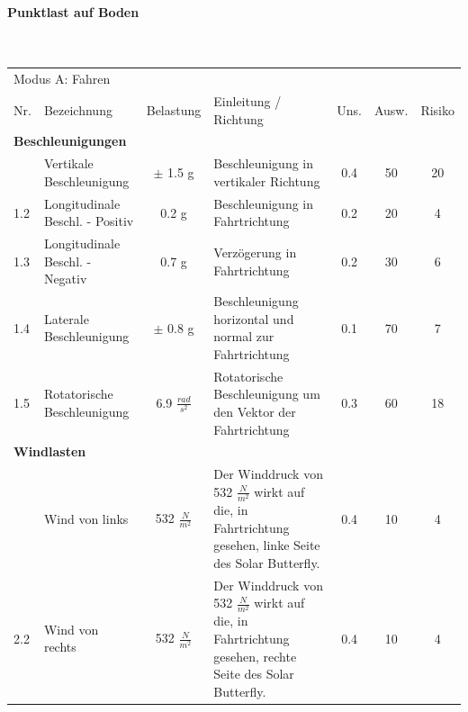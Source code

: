 \paragraph{Punktlast auf Boden}\mbox{}\\

\begin{landscape}%
  \centering %
  \begin{tabularx}{\linewidth}{llcXccc}
    \multicolumn{7}{l}{\LARGE{Modus A: Fahren}}\\
    \thickhline
    Nr. & Bezeichnung & Belastung & Einleitung / Richtung & Uns. & Ausw. & Risiko\\
    \hline
    \multicolumn{7}{l}{\textbf{Beschleunigungen}}\\
    \thickhline
    1.1 & Vertikale Beschleunigung         & $\pm$ 1.5 g           & Beschleunigung in vertikaler Richtung & 0.4 & 50 & 20\\
    1.2 & Longitudinale Beschl. - Positiv  & 0.2 g                 & Beschleunigung in Fahrtrichtung & 0.2 & 20 & 4\\
    1.3 & Longitudinale Beschl. - Negativ  & 0.7 g                 & Verzögerung in Fahrtrichtung & 0.2 & 30 & 6\\
    1.4 & Laterale Beschleunigung          & $\pm$ 0.8 g           & Beschleunigung horizontal und normal zur Fahrtrichtung & 0.1 & 70 & 7\\
    1.5 & Rotatorische Beschleunigung      & 6.9 $\frac{rad}{s^2}$ & Rotatorische Beschleunigung um den Vektor der Fahrtrichtung & 0.3 & 60 & 18\\

    \multicolumn{7}{l}{\textbf{Windlasten}}\\
    \thickhline
    2.1 & Wind von links & 532 $\frac{N}{m^2}$ & Der Winddruck von 532 $\frac{N}{m^2}$ wirkt auf die, in Fahrtrichtung gesehen, linke Seite des Solar Butterfly. %
    & 0.4 & 10 & 4\\
    2.2 & Wind von rechts & 532 $\frac{N}{m^2}$ & Der Winddruck von 532 $\frac{N}{m^2}$ wirkt auf die, in Fahrtrichtung gesehen, rechte Seite des Solar Butterfly. %
    & 0.4 & 10 & 4\\


\end{tabularx}
\end{landscape}
